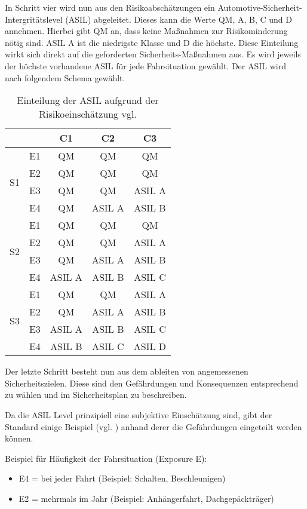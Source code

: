 \documentclass[a4paper,DIV=calc,ngerman]{scrartcl}
\begin{document}
In Schritt vier wird nun aus den Risikoabschätzungen ein Automotive-Sicherheit-Intergritätslevel (ASIL) abgeleitet. Dieses kann die Werte QM, A, B, C und D annehmen. Hierbei gibt QM an, dass keine Maßnahmen zur Risikominderung nötig sind. ASIL A ist die niedrigste Klasse und D die höchste. Diese Einteilung wirkt sich direkt auf die geforderten Sicherheits-Maßnahmen aus. Es wird jeweils der höchste vorhandene ASIL für jede Fahrsituation gewählt. Der ASIL wird nach folgendem Schema gewählt.


\begin{table}[h]
\center
\begin{tabular}[h]{c c | c c c}
\toprule
 &  & C1 & C2 & C3\\
\midrule
\multirow{4}{*}{S1} & E1 & QM & QM & QM\\
 & E2 & QM & QM & QM\\
 & E3 & QM & QM & ASIL A\\
 & E4 & QM & ASIL A & ASIL B\\
\midrule
\multirow{4}{*}{S2} & E1 & QM & QM & QM\\
 & E2 & QM & QM & ASIL A\\
 & E3 & QM & ASIL A & ASIL B\\
 & E4 & ASIL A & ASIL B & ASIL C\\
\midrule
\multirow{4}{*}{S3} & E1 & QM & QM & ASIL A\\
 & E2 & QM & ASIL A & ASIL B\\
 & E3 & ASIL A & ASIL B & ASIL C\\
 & E4 & ASIL B & ASIL C & ASIL D\\
\bottomrule
\end{tabular}
\caption{Einteilung der ASIL aufgrund der Risikoeinschätzung vgl. \cite[S. 125]{1}}
\label{tab:asil}
\end{table}

Der letzte Schritt besteht nun aus dem ableiten von angemessenen Sicherheitszielen. Diese sind den Gefährdungen und Konsequenzen entsprechend zu wählen und im Sicherheitsplan zu beschreiben.

Da die ASIL Level prinzipiell eine subjektive Einschätzung sind, gibt der Standard einige Beispiel (vgl. \cite[S. 125]{1}) anhand derer die Gefährdungen eingeteilt werden können.

Beispiel für Häufigkeit der Fahrsituation (Exposure E):
\begin{itemize}
    \item E4 = bei jeder Fahrt (Beispiel: Schalten, Beschleunigen)
    \item E2 = mehrmals im Jahr (Beispiel: Anhängerfahrt, Dachgepäckträger)
\end{itemize}
\end{document}
